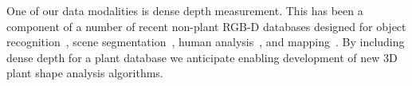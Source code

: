 One of our data modalities is dense depth measurement. This has been a component of a number of recent non-plant RGB-D databases designed for object recognition~\cite{Lai2011}, scene segmentation~\cite{Silberman2011}, human analysis~\cite{Sung2011,Barbosa:reid12}, and mapping~\cite{sturm12iros}. By including dense depth for a plant database we anticipate enabling development of new 3D plant shape analysis algorithms.





